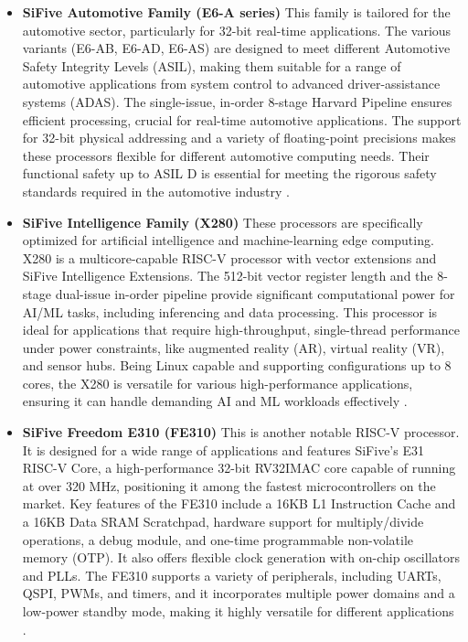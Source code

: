 \documentclass[conference]{IEEEtran}
\begin{document}
\begin{itemize}
    \item \textbf{SiFive Automotive Family (E6-A series)}
This family is tailored for the automotive sector, particularly for 32-bit real-time applications. The various variants (E6-AB, E6-AD, E6-AS) are designed to meet different Automotive Safety Integrity Levels (ASIL), making them suitable for a range of automotive applications from system control to advanced driver-assistance systems (ADAS). The single-issue, in-order 8-stage Harvard Pipeline ensures efficient processing, crucial for real-time automotive applications. The support for 32-bit physical addressing and a variety of floating-point precisions makes these processors flexible for different automotive computing needs. Their functional safety up to ASIL D is essential for meeting the rigorous safety standards required in the automotive industry \cite{12}.
    
  
    \item \textbf{SiFive Intelligence Family (X280)}
These processors are specifically optimized for artificial intelligence and machine-learning edge computing. X280 is a multicore-capable RISC-V processor with vector extensions and SiFive Intelligence Extensions. The 512-bit vector register length and the 8-stage dual-issue in-order pipeline provide significant computational power for AI/ML tasks, including inferencing and data processing. This processor is ideal for applications that require high-throughput, single-thread performance under power constraints, like augmented reality (AR), virtual reality (VR), and sensor hubs. Being Linux capable and supporting configurations up to 8 cores, the X280 is versatile for various high-performance applications, ensuring it can handle demanding AI and ML workloads effectively \cite{12}.


 \item \textbf{ SiFive Freedom E310 (FE310) }
 This is another notable RISC-V processor. It is designed for a wide range of applications and features SiFive’s E31 RISC-V Core, a high-performance 32-bit RV32IMAC core capable of running at over 320 MHz, positioning it among the fastest microcontrollers on the market. Key features of the FE310 include a 16KB L1 Instruction Cache and a 16KB Data SRAM Scratchpad, hardware support for multiply/divide operations, a debug module, and one-time programmable non-volatile memory (OTP). It also offers flexible clock generation with on-chip oscillators and PLLs. The FE310 supports a variety of peripherals, including UARTs, QSPI, PWMs, and timers, and it incorporates multiple power domains and a low-power standby mode, making it highly versatile for different applications \cite{11}.


\end{itemize}
\end{document}
